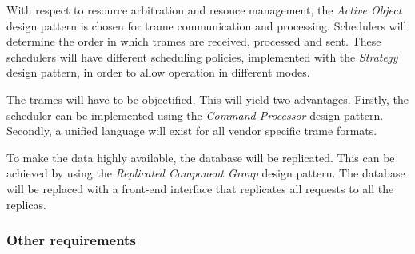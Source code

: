 \npar With respect to resource arbitration and resouce management, the
\emph{Active Object} design pattern is chosen for trame communication and
processing. Schedulers will determine the order in which trames are received,
processed and sent. These schedulers will have different scheduling policies,
implemented with the \emph{Strategy} design pattern, in order to allow operation
in different modes.

\npar The trames will have to be objectified. This will yield two advantages.
Firstly, the scheduler can be implemented using the \emph{Command Processor}
design pattern. Secondly, a unified language will exist for all vendor
specific trame formats.

\npar To make the data highly available, the database will be replicated. This
can be achieved by using the \emph{Replicated Component Group} design pattern.
The database will be replaced with a front-end interface that replicates all
requests to all the replicas. 

\subsubsection{Other requirements}
\label{others:whole-system}





